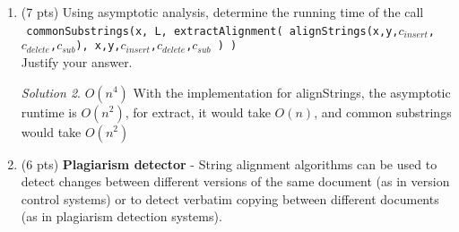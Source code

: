 \documentclass[12pt]{article}
\theoremstyle{remark}
\newtheorem*{solution}{Solution}
\begin{document}
\begin{enumerate}
\begin{enumerate}
	\textbf{Submit: }
	\begin{itemize}
	    \item A brief paragraph for each function that explains how you implemented it (describe how it works and how it uses its data structures).
	    \item Your code implementation, with code (the code should be submitted on Canvas)
	    \item The cost matrix $S$ that your code produces on the strings  x={\tt EXPONENTIAL} and y={\tt POLYNOMIAL} with $c_{insert} = 2$, $c_{delete} = 1$, $c_{sub} = 2$
	\end{itemize}
	\label{q:align:code}
	
	\begin{solution} Matrix: 
\begin{verbatim}
[[ 0  1  2  3  4  5  6  7  8  9 10 11]
 [ 1  2  3  1  2  3  4  5  6  7  8  9]
 [ 2  3  4  2  1  2  3  4  5  6  7  8]
 [ 3  4  5  3  2  3  4  5  6  7  8  1]
 [ 4  5  6  4  3  4  5  6  7  8  9  2]
 [ 5  6  7  5  4  1  2  1  2  3  4  3]
 [ 6  7  8  6  1  2  3  2  3  4  5  4]
 [ 7  8  9  7  2  3  4  3  4  5  6  5]
 [ 8  9 10  8  3  4  5  4  5  1  2  3]
 [ 9 10 11  9  4  5  6  5  6  2  1  2]
 [10 11 12 10  5  6  7  6  7  3  2  1]]
	\end{verbatim}
	\end{solution}
	
	
	\item (7 pts) Using asymptotic analysis, determine the running time of the call \\ ${}^{}$\hspace{0mm} {\tt commonSubstrings(x, L, extractAlignment(  alignStrings(x,y,$c_{insert}$,$c_{delete}$,$c_{sub}$), x,y,$c_{insert}$,$c_{delete}$,$c_{sub}$  )  )} \\
	Justify your answer.

	\begin{solution}
	$O(n^4)$ With the implementation for alignStrings, the asymptotic runtime is $O(n^2)$, for extract, it would take $O(n)$, and common substrings would take $O(n^2)$
	\end{solution}
\pagebreak



	\item (6 pts) \textbf{Plagiarism detector} - String alignment algorithms can be used to detect changes between different versions of the same document (as in version control systems) or to detect verbatim copying between different documents (as in plagiarism detection systems).
	

\end{enumerate}
\end{enumerate}
\end{document}
